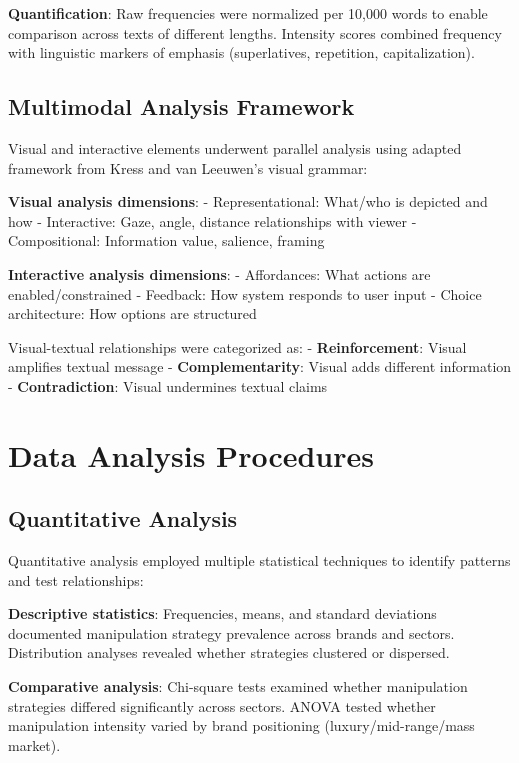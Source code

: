 \textbf{Quantification}: Raw frequencies were normalized per 10,000 words to enable comparison across texts of different lengths. Intensity scores combined frequency with linguistic markers of emphasis (superlatives, repetition, capitalization).

\subsection{Multimodal Analysis Framework}

Visual and interactive elements underwent parallel analysis using adapted framework from Kress and van Leeuwen's visual grammar:

\textbf{Visual analysis dimensions}:
- Representational: What/who is depicted and how
- Interactive: Gaze, angle, distance relationships with viewer
- Compositional: Information value, salience, framing

\textbf{Interactive analysis dimensions}:
- Affordances: What actions are enabled/constrained
- Feedback: How system responds to user input
- Choice architecture: How options are structured

Visual-textual relationships were categorized as:
- \textbf{Reinforcement}: Visual amplifies textual message
- \textbf{Complementarity}: Visual adds different information
- \textbf{Contradiction}: Visual undermines textual claims

\section{Data Analysis Procedures}
\label{sec:analysis_procedures}

\subsection{Quantitative Analysis}

Quantitative analysis employed multiple statistical techniques to identify patterns and test relationships:

\textbf{Descriptive statistics}: Frequencies, means, and standard deviations documented manipulation strategy prevalence across brands and sectors. Distribution analyses revealed whether strategies clustered or dispersed.

\textbf{Comparative analysis}: Chi-square tests examined whether manipulation strategies differed significantly across sectors. ANOVA tested whether manipulation intensity varied by brand positioning (luxury/mid-range/mass market).

